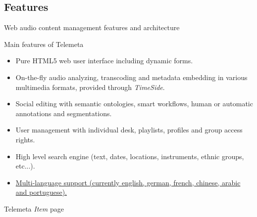 \documentclass[final, hyperref, table]{beamer}
\begin{document}
\subsection{Features}
\begin{frame}[label=telemeta_features]{Web audio content management features and architecture}
  \begin{block}{Main features of Telemeta}\footnotesize
    \begin{itemize}
      \item \alert{Pure HTML5} web user interface including dynamic forms.
      \item \alert{On-the-fly audio analyzing}, transcoding and metadata
        embedding in various multimedia formats, provided through \emph{TimeSide}.
      \item \alert{Social editing} with semantic ontologies, smart workflows, human or automatic annotations and segmentations.
      \item \alert{User management} with individual desk, playlists, profiles
        and group access rights.
      \item \alert{High level search engine} (text, dates, locations, instruments, ethnic groups, etc...).
      \item \hyperlink{telemeta_languages}{Multi-language support (currently english, german, french, chinese, arabic and portuguese).}
      \end{itemize}
  \end{block}
\end{frame}


\begin{frame}[plain]{Telemeta \emph{Item} page}
  \begin{center}
  \end{center}

\end{frame}
\end{document}
